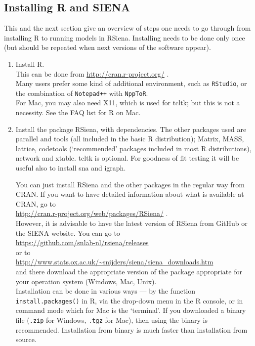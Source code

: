 \documentclass[a4paper,fleqn,11pt]{article}
\newcommand{\+}{\, + \,}
\newcommand{\sfn}[1]{\textsf{#1}}
\newcommand{\R}{{\sf R }}
\newcommand{\Rn}{{\sf R}}
\newcommand{\rs}{{\sf RSiena}}
\newcommand{\RS}{{\sf RSiena }}
\newcommand{\SI}{{\sf SIENA }}
\begin{document}
\subsection{Installing \R and \SI }
\label{S_use}
\noindent
This and the next section give an overview of steps one needs to go through from
installing \R to running models in \rs.
Installing needs to be done only once (but should be repeated when next versions
of the software appear).

\begin{enumerate}
	\item	Install \Rn.\\
            This can be done from \url{http://cran.r-project.org/} .\\
            Many users prefer some kind of additional environment, such as \texttt{RStudio}, or
            the combination of \texttt{Notepad++} with \texttt{NppToR}.\\
            For Mac, you may also need \sfn{X11}, which is
            used for \sfn{tcltk}; but this is not a necessity. See the FAQ list for R on Mac.
	\item	Install the package \rs, with dependencies.
            The other packages used are  \sfn{parallel}
            and \sfn{tools} (all included in the basic \R distribution);
            \sfn{Matrix}, \sfn{MASS}, \sfn{lattice}, \sfn{codetools}
            (`recommended' packages included in most R distributions),
            \sfn{network} and \sfn{xtable}. \sfn{tcltk} is optional.
            For goodness of fit testing it will be useful also to
            install \sfn{sna} and \sfn{igraph}.

            You can just install \RS and the other packages
            in the regular way from CRAN.
            If you want to have detailed information about
            what is available at CRAN, go to\\
\url{http://cran.r-project.org/web/packages/RSiena/} .\\
            However, it is advisable to have the latest version of \RS
            from GitHub or the \SI website.
            You can go to\\
            \url{https://github.com/snlab-nl/rsiena/releases}\\
            or to\\
              \url{http://www.stats.ox.ac.uk/~snijders/siena/siena_downloads.htm}\\
            and there download the appropriate version of the package
            appropriate for your operation system (Windows, Mac, Unix). \\
            Installation can be done in various ways --- by the function \texttt{install.packages()}
            in \Rn,
            via the drop-down menu in the \R console, or in command mode which for Mac is
            the `terminal'.
            If you downloaded a binary file (\texttt{.zip} for Windows,
            \texttt{.tgz} for Mac),
            then using the binary is recommended.
            Installation from binary is much faster than installation from source.


\end{enumerate}
\end{document}

